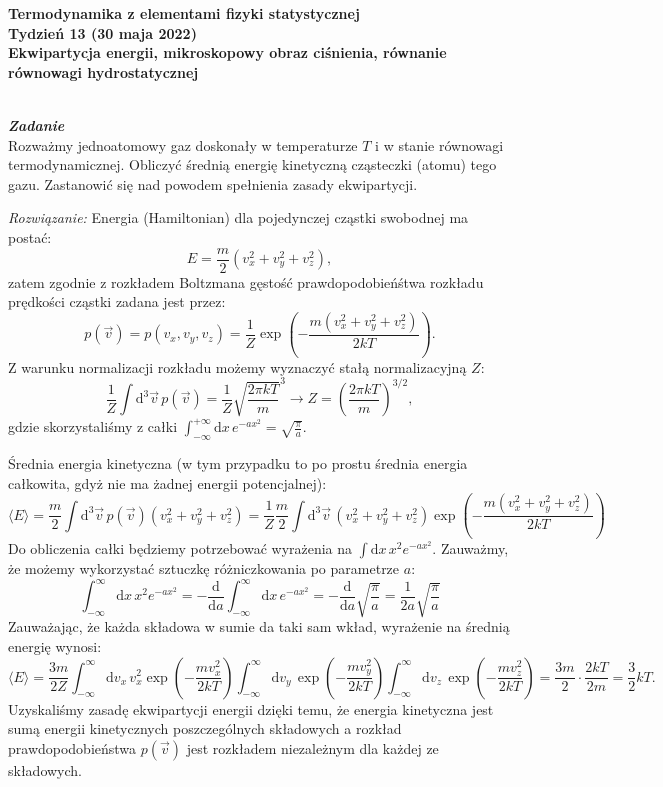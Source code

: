 \documentclass[11pt,a4paper]{article}
\newcounter{zadanie}\newcommand{\zadanie}[1][]{\addtocounter{zadanie}{1} ~\\  {\bf \emph{Zadanie \arabic{zadanie} #1 }} \\}
\renewcommand{\t}[1]{\textrm{#1}}
\begin{document}
\begin{centering}
\bf{\Large{Termodynamika z elementami fizyki statystycznej}}\\
Tydzień 13 (30 maja 2022)\\[5mm]
Ekwipartycja energii, mikroskopowy obraz ciśnienia, równanie równowagi hydrostatycznej\\
\end{centering}
\vspace{10mm}


\zadanie
Rozważmy jednoatomowy gaz doskonały w temperaturze $T$ i w stanie równowagi termodynamicznej.
Obliczyć średnią energię kinetyczną cząsteczki (atomu) tego gazu.
Zastanowić się nad powodem spełnienia zasady ekwipartycji.
\newline

\emph{Rozwiązanie:} Energia (Hamiltonian) dla pojedynczej cząstki swobodnej ma postać:
$$
E = \frac{m}{2}(v_x^2 + v_y^2 + v_z^2),
$$
zatem zgodnie z rozkładem Boltzmana gęstość prawdopodobieńśtwa rozkładu prędkości cząstki zadana jest przez:
$$
p(\vec{v}) = p(v_x,v_y,v_z) = \frac{1}{Z}\exp\left(-\frac{m(v_x^2+v_y^2+ v_z^2)}{2 k T}  \right).
$$
Z warunku normalizacji rozkładu możemy wyznaczyć stałą  normalizacyjną $Z$:
$$
\frac{1}{Z}\int \textrm{d}^3 \vec{v} \, p(\vec{v}) = \frac{1}{Z} \sqrt{\frac{2 \pi k T }{m}}^3 \longrightarrow Z = \left(\frac{2 \pi k T }{m}\right)^{3/2},
$$
gdzie skorzystaliśmy z całki $\int_{-\infty}^{+\infty} \textrm{d}x\, e^{-a x^2} = \sqrt{\frac{\pi}{a}}$.

Średnia energia kinetyczna (w tym przypadku to po prostu średnia energia całkowita, gdyż nie ma żadnej energii potencjalnej):
$$
\langle E \rangle = \frac{m}{2} \int \textrm{d}^3 \vec{v}\,
p(\vec{v})(v_x^2 + v_y^2 + v_z^2) = \frac{1}{Z} \frac{m}{2} \int \textrm{d}^3\vec{v}\, (v_x^2+v_y^2+v_z^2) \exp\left(- \frac{m(v_x^2+v_y^2+ v_z^2)}{2 k T}   \right)
$$
Do obliczenia całki będziemy potrzebować wyrażenia na $\int \t{d} x \, x^2 e^{-a x^2}$.
Zauważmy, że możemy wykorzystać sztuczkę różniczkowania po parametrze $a$:
$$
\int_{-\infty}^{\infty} \t{d} x \, x^2 e^{-a x^2} = - \frac{\t{d}}{\t{d}a} \int_{-\infty}^{\infty} \t{d} x\, e^{-a x^2} = - \frac{\t{d}}{\t{d}a} \sqrt{\frac{\pi}{a}} = \frac{1}{2a }\sqrt{\frac{\pi}{a}}
$$
Zauważając, że każda składowa w sumie da taki sam wkład, wyrażenie na średnią energię wynosi:
$$
\langle E \rangle =  \frac{3 m}{2 Z} \int_{-\infty}^\infty \textrm{d}v_x\,  v_x^2 \exp\left(-\frac{m v_x^2}{2 k T}\right) \int_{-\infty}^{\infty} \textrm{d}v_y\,  \exp\left(-\frac{m v_y^2}{2 k T}\right)\int_{-\infty}^\infty \textrm{d}v_z\,  \exp\left(-\frac{m v_z^2}{2 k T}\right) =  \frac{3m}{2} \cdot \frac{2 k T}{2 m } = \frac{3}{2} k T.
$$
Uzyskaliśmy zasadę ekwipartycji energii dzięki temu, że energia kinetyczna jest sumą energii kinetycznych poszczególnych składowych a rozkład prawdopodobieństwa $p(\vec{v})$ jest rozkładem niezależnym dla każdej ze składowych.
\end{document}
